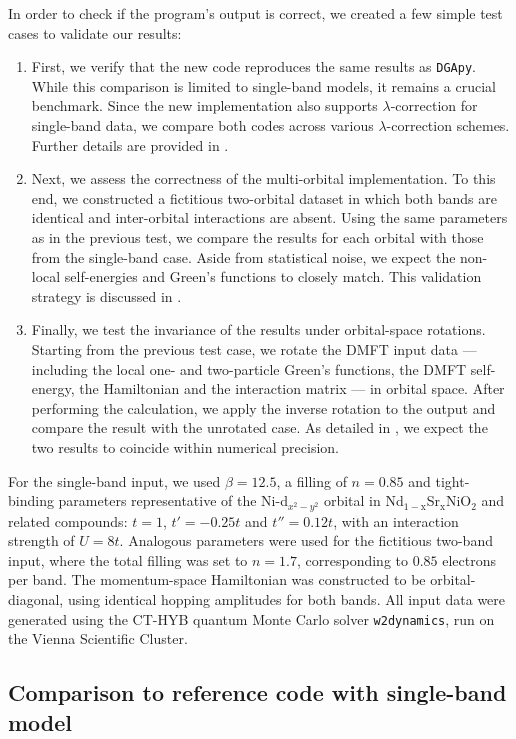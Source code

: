 \documentclass[../../main.tex]{subfiles}
\begin{document}
In order to check if the program's output is correct, we created a few simple test cases to validate our results:
\begin{enumerate}[label=(\roman*)]
\item First, we verify that the new code reproduces the same results as \texttt{DGApy}. While this comparison is limited to single-band models, it remains a crucial benchmark. Since the new implementation also supports $\lambda$-correction for single-band data, we compare both codes across various $\lambda$-correction schemes. Further details are provided in .
\item Next, we assess the correctness of the multi-orbital implementation. To this end, we constructed a fictitious two-orbital dataset in which both bands are identical and inter-orbital interactions are absent. Using the same parameters as in the previous test, we compare the results for each orbital with those from the single-band case. Aside from statistical noise, we expect the non-local self-energies and Green's functions to closely match. This validation strategy is discussed in .
\item Finally, we test the invariance of the results under orbital-space rotations. Starting from the previous test case, we rotate the DMFT input data --- including the local one- and two-particle Green's functions, the DMFT self-energy, the Hamiltonian and the interaction matrix --- in orbital space. After performing the calculation, we apply the inverse rotation to the output and compare the result with the unrotated case. As detailed in , we expect the two results to coincide within numerical precision.
\end{enumerate}
For the single-band input, we used $\beta=12.5$, a filling of $n=0.85$ and tight-binding parameters representative of the Ni-d$_{x^2-y^2}$ orbital in Nd$_{1-\text{x}}$Sr$_{\text{x}}$NiO$_{2}$ and related compounds: $t=1$, $t'=-0.25t$ and $t''=0.12t$, with an interaction strength of $U=8t$. Analogous parameters were used for the fictitious two-band input, where the total filling was set to $n=1.7$, corresponding to $0.85$ electrons per band. The momentum-space Hamiltonian was constructed to be orbital-diagonal, using identical hopping amplitudes for both bands. All input data were generated using the CT-HYB quantum Monte Carlo solver \texttt{w2dynamics}, run on the Vienna Scientific Cluster.

\subsection{Comparison to reference code with single-band model}\label{sec:validation_i}
\end{document}
